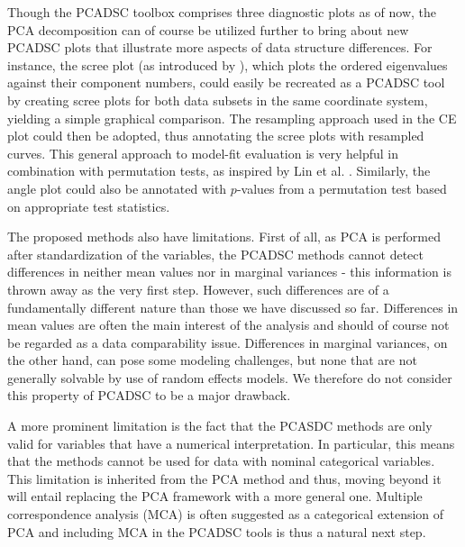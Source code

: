 \documentclass[titlepage,11pt,twoside]{article}
\begin{document}
Though the PCADSC toolbox comprises three diagnostic plots as of now, the PCA decomposition can of course be utilized further to bring about new PCADSC plots that illustrate more aspects of data structure differences. For instance, the scree plot (as introduced by \cite{Cattell1966}), which plots the ordered eigenvalues against their component numbers, could easily be recreated as a PCADSC tool by creating scree plots for both data subsets in the same coordinate system, yielding a simple graphical comparison. The resampling approach used in the CE plot could then be adopted, thus annotating the scree plots with resampled curves. This general approach to model-fit evaluation is very helpful in combination with permutation tests, %
as inspired by Lin et al. \citeyearpar{LinEtAl2002}. Similarly, the angle plot could also be annotated with $p$-values from a permutation test based on appropriate test statistics. 

The proposed methods also have limitations. First of all, as PCA is performed after standardization of the variables, the PCADSC methods cannot detect differences in neither mean values nor in marginal variances - this information is thrown away as the very first step. However, such differences are of a fundamentally different nature than those we have discussed so far. Differences in mean values are often the main interest of the analysis and should of course not be regarded as a data comparability issue. Differences in marginal variances, on the other hand, can pose some modeling challenges, but none that are not generally solvable by use of random effects models. We therefore do not consider this property of PCADSC to be a major drawback. 

A more prominent limitation is the fact that the PCASDC methods are only valid for variables that have a numerical interpretation. In particular, this means that the methods cannot be used for data with nominal categorical variables. This limitation is inherited from the PCA method and thus, moving beyond it will entail replacing the PCA framework with a more general one. Multiple correspondence analysis (MCA) is often suggested as a categorical extension of PCA \citep{Abdi2010} and including MCA in the PCADSC tools is thus a natural next step. 
\end{document}
